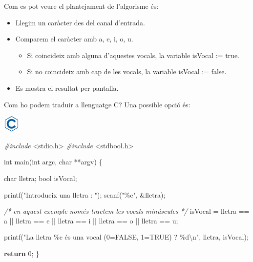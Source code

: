 \documentclass[]{book}
\newenvironment{Shaded}{\begin{snugshade}}{\end{snugshade}}
\newcommand{\CharTok}[1]{\textcolor[rgb]{0.31,0.60,0.02}{#1}}
\newcommand{\CommentTok}[1]{\textcolor[rgb]{0.56,0.35,0.01}{\textit{#1}}}
\newcommand{\ControlFlowTok}[1]{\textcolor[rgb]{0.13,0.29,0.53}{\textbf{#1}}}
\newcommand{\DataTypeTok}[1]{\textcolor[rgb]{0.13,0.29,0.53}{#1}}
\newcommand{\DecValTok}[1]{\textcolor[rgb]{0.00,0.00,0.81}{#1}}
\newcommand{\ImportTok}[1]{#1}
\newcommand{\NormalTok}[1]{#1}
\newcommand{\PreprocessorTok}[1]{\textcolor[rgb]{0.56,0.35,0.01}{\textit{#1}}}
\newcommand{\SpecialCharTok}[1]{\textcolor[rgb]{0.00,0.00,0.00}{#1}}
\newcommand{\StringTok}[1]{\textcolor[rgb]{0.31,0.60,0.02}{#1}}
\providecommand{\tightlist}{%
  \setlength{\itemsep}{0pt}\setlength{\parskip}{0pt}}
\begin{document}
Com es pot veure el plantejament de l'algorisme és:

\begin{itemize}
\tightlist
\item
  Llegim un caràcter des del canal d'entrada.
\item
  Comparem el caràcter amb a, e, i, o, u.

  \begin{itemize}
  \tightlist
  \item
    Si coincideix amb alguna d'aquestes vocals, la variable isVocal := true.
  \item
    Si no coincideix amb cap de les vocals, la variable isVocal := false.
  \end{itemize}
\item
  Es mostra el resultat per pantalla.
\end{itemize}

Com ho podem traduir a llenguatge C? Una possible opció és:

\includegraphics{./img/c.png}

\begin{Shaded}
\begin{Highlighting}[]
\PreprocessorTok{\#include }\ImportTok{\textless{}stdio.h\textgreater{}}
\PreprocessorTok{\#include }\ImportTok{\textless{}stdbool.h\textgreater{}}

\DataTypeTok{int}\NormalTok{ main(}\DataTypeTok{int}\NormalTok{ argc, }\DataTypeTok{char}\NormalTok{ **argv) \{}

    \DataTypeTok{char}\NormalTok{ lletra;}
    \DataTypeTok{bool}\NormalTok{ isVocal;}

\NormalTok{    printf(}\StringTok{"Introdueix una lletra : "}\NormalTok{);}
\NormalTok{    scanf(}\StringTok{"\%c"}\NormalTok{, \&lletra);}

    \CommentTok{/* en aquest exemple només tractem les vocals minúscules */}
\NormalTok{    isVocal = lletra == }\CharTok{\textquotesingle{}a\textquotesingle{}}\NormalTok{ || lletra == }\CharTok{\textquotesingle{}e\textquotesingle{}}\NormalTok{ || lletra == }\CharTok{\textquotesingle{}i\textquotesingle{}}\NormalTok{ || lletra == }\CharTok{\textquotesingle{}o\textquotesingle{}}\NormalTok{ || lletra == }\CharTok{\textquotesingle{}u\textquotesingle{}}\NormalTok{;}

\NormalTok{    printf(}\StringTok{"La lletra \%c és una vocal (0=FALSE, 1=TRUE) ? \%d}\SpecialCharTok{\textbackslash{}n}\StringTok{"}\NormalTok{, lletra, isVocal);}

    \ControlFlowTok{return} \DecValTok{0}\NormalTok{;}
\NormalTok{\}}
\end{Highlighting}
\end{Shaded}
\end{document}
